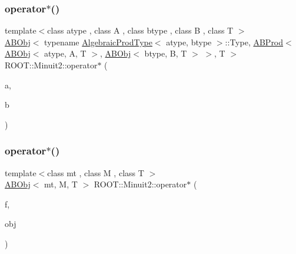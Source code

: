 \subsubsection{\texorpdfstring{operator$\ast$()}{operator*()}\hspace{0.1cm}{\footnotesize\ttfamily [3/4]}}
{\footnotesize\ttfamily template$<$class atype , class A , class btype , class B , class T $>$ \\
\mbox{\hyperlink{classROOT_1_1Minuit2_1_1ABObj}{A\+B\+Obj}}$<$ typename \mbox{\hyperlink{classROOT_1_1Minuit2_1_1AlgebraicProdType}{Algebraic\+Prod\+Type}}$<$ atype, btype $>$\+::Type, \mbox{\hyperlink{classROOT_1_1Minuit2_1_1ABProd}{A\+B\+Prod}}$<$ \mbox{\hyperlink{classROOT_1_1Minuit2_1_1ABObj}{A\+B\+Obj}}$<$ atype, A, T $>$, \mbox{\hyperlink{classROOT_1_1Minuit2_1_1ABObj}{A\+B\+Obj}}$<$ btype, B, T $>$ $>$, T $>$ R\+O\+O\+T\+::\+Minuit2\+::operator$\ast$ (\begin{DoxyParamCaption}\item[{const \mbox{\hyperlink{classROOT_1_1Minuit2_1_1ABObj}{A\+B\+Obj}}$<$ atype, A, T $>$ \&}]{a,  }\item[{const \mbox{\hyperlink{classROOT_1_1Minuit2_1_1ABObj}{A\+B\+Obj}}$<$ btype, B, T $>$ \&}]{b }\end{DoxyParamCaption})\hspace{0.3cm}{\ttfamily [inline]}}

\mbox{\label{namespaceROOT_1_1Minuit2_a03054cc34855692b00d3dd16a0389195}} 
\subsubsection{\texorpdfstring{operator$\ast$()}{operator*()}\hspace{0.1cm}{\footnotesize\ttfamily [4/4]}}
{\footnotesize\ttfamily template$<$class mt , class M , class T $>$ \\
\mbox{\hyperlink{classROOT_1_1Minuit2_1_1ABObj}{A\+B\+Obj}}$<$ mt, M, T $>$ R\+O\+O\+T\+::\+Minuit2\+::operator$\ast$ (\begin{DoxyParamCaption}\item[{T}]{f,  }\item[{const M \&}]{obj }\end{DoxyParamCaption})\hspace{0.3cm}{\ttfamily [inline]}}


